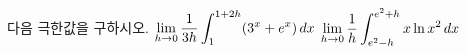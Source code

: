 다음 극한값을 구하시오.
 $\displaystyle\lim_{h\to 0}\dfrac{1}{3h}\int_{1}^{1+2h}(3^x+e^x)\mkern3mu dx$
 $\displaystyle\lim_{h\to 0}\dfrac{1}{h}\int_{e^2-h}^{e^2+h}x\ln x^2\mkern3mu dx$
